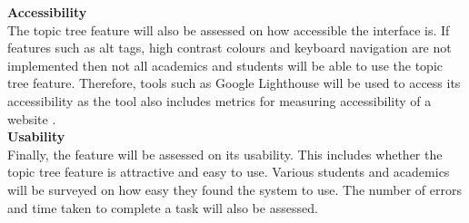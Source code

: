 \textbf{Accessibility} \\
The topic tree feature will also be assessed on how accessible the interface is. If features such as alt tags, high contrast colours and keyboard navigation are not implemented then not all academics and students will be able to use the topic tree feature. Therefore, tools such as Google Lighthouse will be used to access its accessibility as the tool also includes metrics for measuring accessibility of a website \cite{googleLighthouseAccessibility}. \\

\textbf{Usability} \\
Finally, the feature will be assessed on its usability. This includes whether the topic tree feature is attractive and easy to use. Various students and academics will be surveyed on how easy they found the system to use. The number of errors and time taken to complete a task will also be assessed.\\
